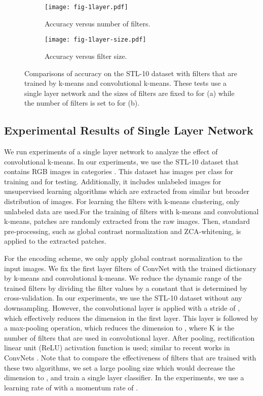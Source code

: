 \documentclass{article} \usepackage{iclr2016_workshop,times}
\begin{document}
\begin{figure*} \centering
  \begin{subfigure}[b]{0.5\textwidth}
   \texttt{[image: fig-1layer.pdf]}
    \caption{Accuracy versus number of filters.}
  \label{fig:acc-features}
   \end{subfigure}\begin{subfigure}[b]{0.5\textwidth}
     \texttt{[image: fig-1layer-size.pdf]}
    \caption{Accuracy versus filter size.}
  \label{fig:acc-size}
   \end{subfigure}
  \caption{
    Comparisons of accuracy on the STL-10 dataset with filters that are trained by k-means and convolutional k-means.
    These tests use a single layer network and the sizes of filters are fixed to  for (a) while the number of filters is set to  for (b).
  }
  \label{fig:accuracies}
\end{figure*}


\subsection{Experimental Results of Single Layer Network}\label{sec:oneLayer}

We run experiments of a single layer network to analyze the effect of convolutional k-means.
In our experiments, we use the STL-10 dataset that contains  RGB images in  categories \citep{coates2011analysis}.
This dataset has  images per class for training and  for testing.
Additionally, it includes  unlabeled images for unsupervised learning algorithms which are extracted from similar but broader distribution of images.
For learning the filters with k-means clustering, only unlabeled data are used.For the training of filters with k-means and convolutional k-means, patches are randomly extracted from the raw images.
Then, standard pre-processing, such as global contrast normalization and ZCA-whitening, is applied to the extracted patches.

For the encoding scheme, we only apply global contrast normalization to the input images. 
We fix the first layer filters of ConvNet with the trained dictionary by k-means and convolutional k-means.
We reduce the dynamic range of the trained filters by dividing the filter values by a constant that is determined by cross-validation.
In our experiments, we use the STL-10 dataset without any downsampling. However, the convolutional layer is applied with a stride of , which effectively reduces the dimension in the first layer.
This layer is followed by a max-pooling operation, which reduces the dimension to , where K is the number of filters that are used in convolutional layer.
After pooling, rectification linear unit (ReLU) activation function is used;  similar to recent works in ConvNets \citep{krizhevsky2012imagenet}.
Note that to compare the effectiveness of filters that are trained with these two algorithms, 
we set a large pooling size which would decrease the dimension to , and train a single layer classifier. 
In the experiments, we use a learning rate of  with a momentum rate of .
\end{document}

